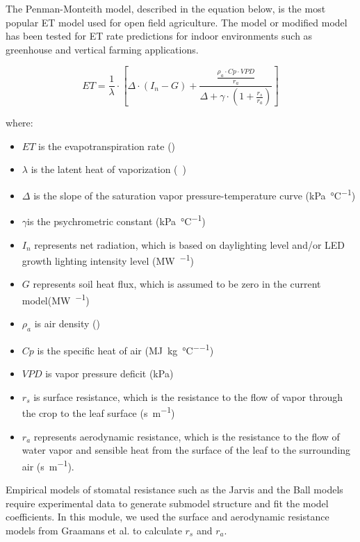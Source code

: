 The Penman-Monteith model, described in the equation below,  is the most popular ET model used for open field agriculture. The model or modified model has been tested for ET rate predictions for indoor environments such as greenhouse and vertical farming applications.

\begin{equation}
ET=\frac{1}{\lambda} \cdot \left[
  \Delta \cdot(I_n-G)
+ \frac{
    \frac{\rho_a \cdot Cp \cdot VPD}{r_a}
  }
  {
     \Delta+\gamma \cdot (1+\frac{r_s}{r_a} )
  }
\right]
\end{equation}

where:

\begin{itemize}
\tightlist
\item
  \(ET\) is the evapotranspiration rate (\si{\evapotranspirationRate})
\item
  \(\lambda\) is the latent heat of vaporization (\si{\mega\specificEnthalpy})
\item
  \(\Delta\) is the slope of the saturation vapor pressure-temperature curve (\si{\kPa\per\celsius})
\item
  \(\gamma\)is the psychrometric constant (\si{\kPa\per\celsius})
\item
  \(I_n\) represents net radiation, which is based on daylighting level and/or LED growth lighting intensity level (\si{\mega\watt\per\area})
\item
  \(G\) represents soil heat flux, which is assumed to be zero in the current model(\si{\MW\per\area})
\item
  \(\rho_a\) is air density (\si{\density})
\item
  \(Cp\) is the specific heat of air (\si{\mega\J\per\kg\per\celsius})
\item
  \(VPD\) is vapor pressure deficit (\si{\kPa})
\item
  \(r_s\) is surface resistance, which is the resistance to the flow of vapor through the crop to the leaf surface (\si{\s\per\m})
\item
  \(r_a\) represents aerodynamic resistance, which is the resistance to the flow of water vapor and sensible heat from the surface of the leaf to the surrounding air (\si{\s\per\m}).
\end{itemize}

Empirical models of stomatal resistance such as the Jarvis and the Ball models require experimental data to generate submodel structure and fit the model coefficients.  In this module, we used the surface and aerodynamic resistance models from Graamans et al. to calculate $r_s$ and $r_a$.

